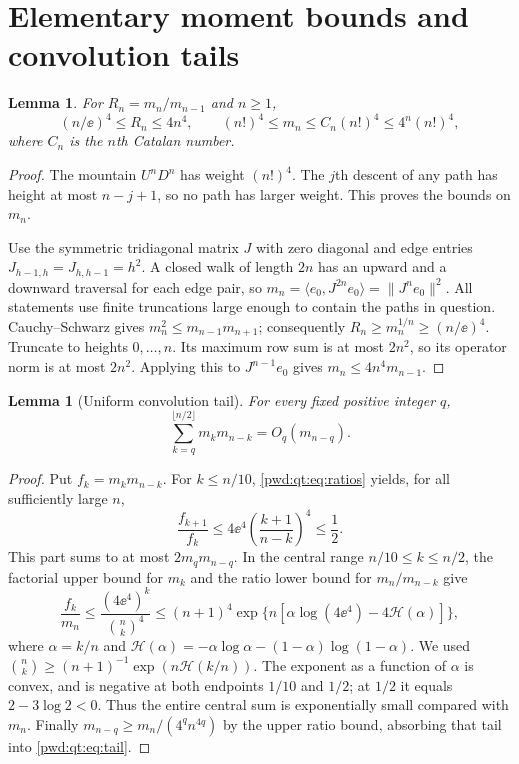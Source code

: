 \documentclass[11pt,letterpaper]{article}
\numberwithin{equation}{section}
\newtheorem{lemma}[theorem]{Lemma}
\theoremstyle{remark}\newtheorem{remark}[theorem]{Remark}
\begin{document}
\section{Elementary moment bounds and convolution tails}\label{pwd:qt:sec:bounds}
\begin{lemma}\label{pwd:qt:lem:ratios}
For $R_n=m_n/m_{n-1}$ and $n\ge1$,
\begin{equation}\label{pwd:qt:eq:ratios}
 (n/\ee)^4\le R_n\le4n^4,\qquad
 (n!)^4\le m_n\le C_n(n!)^4\le4^n(n!)^4,
\end{equation}
where $C_n$ is the $n$th Catalan number.
\end{lemma}
\begin{proof}
The mountain $U^nD^n$ has weight $(n!)^4$. The $j$th descent of any path has height at most $n-j+1$, so no path has larger weight. This proves the bounds on $m_n$.

Use the symmetric tridiagonal matrix $J$ with zero diagonal and edge entries $J_{h-1,h}=J_{h,h-1}=h^2$. A closed walk of length $2n$ has an upward and a downward traversal for each edge pair, so
$m_n=\langle e_0,J^{2n}e_0\rangle=\|J^ne_0\|^2$.
All statements use finite truncations large enough to contain the paths in question. Cauchy--Schwarz gives $m_n^2\le m_{n-1}m_{n+1}$; consequently $R_n\ge m_n^{1/n}\ge(n/\ee)^4$. Truncate to heights $0,\ldots,n$. Its maximum row sum is at most $2n^2$, so its operator norm is at most $2n^2$. Applying this to $J^{n-1}e_0$ gives $m_n\le4n^4m_{n-1}$.
\end{proof}

\begin{lemma}[Uniform convolution tail]\label{pwd:qt:lem:tail}
For every fixed positive integer $q$,
\begin{equation}\label{pwd:qt:eq:tail}
 \sum_{k=q}^{\lfloor n/2\rfloor}m_km_{n-k}=O_q(m_{n-q}).
\end{equation}
\end{lemma}
\begin{proof}
Put $f_k=m_km_{n-k}$. For $k\le n/10$, \eqref{pwd:qt:eq:ratios} yields, for all sufficiently large $n$,
\[
 \frac{f_{k+1}}{f_k}\le4\ee^4\left(\frac{k+1}{n-k}\right)^4\le\frac12.
\]
This part sums to at most $2m_qm_{n-q}$. In the central range $n/10\le k\le n/2$, the factorial upper bound for $m_k$ and the ratio lower bound for $m_n/m_{n-k}$ give
\[
 \frac{f_k}{m_n}\le\frac{(4\ee^4)^k}{\binom nk^4}
 \le(n+1)^4\exp\{n[\alpha\log(4\ee^4)-4\mathcal H(\alpha)]\},
\]
where $\alpha=k/n$ and $\mathcal H(\alpha)=-\alpha\log\alpha-(1-\alpha)\log(1-\alpha)$. We used $\binom nk\ge(n+1)^{-1}\exp(n\mathcal H(k/n))$. The exponent as a function of $\alpha$ is convex, and is negative at both endpoints $1/10$ and $1/2$; at $1/2$ it equals $2-3\log2<0$. Thus the entire central sum is exponentially small compared with $m_n$. Finally $m_{n-q}\ge m_n/(4^qn^{4q})$ by the upper ratio bound, absorbing that tail into \eqref{pwd:qt:eq:tail}.
\end{proof}
\end{document}
